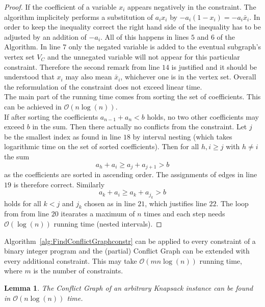 \documentclass[titlepage, a4paper]{amsbook}
\theoremstyle{plain}
\newtheorem{lem}[thm]{Lemma}
\theoremstyle{break}
\theoremstyle{definition}
\theoremstyle{remark}
\numberwithin{equation}{thm}
\begin{document}
\begin{proof}
If the coefficient of a variable $x_i$ appears negatively in the constraint. The algorithm implicitely performs a substitution of $a_i x_i$ by $-a_i(1-x_i) = -a_i \bar{x}_i$. In order to keep the inequality correct the right hand side of the inequality has to be adjusted by an addition of $-a_i$. All of this happens in lines $5$ and $6$ of the Algorithm. In line $7$ only the negated variable is added to the eventual subgraph's vertex set $V_C$ and the unnegated variable will not appear for this particular constraint. Therefore the second remark from line $14$ is justified and it should be understood that $x_i$ may also mean $\bar{x}_i$, whichever one is in the vertex set. Overall the reformulation of the constraint does not exceed linear time.\\
The main part of the running time comes from sorting the set of coefficients. This can be achieved in $\mathcal{O}(n \log(n))$. \\
If after sorting the coefficients $a_{n-1}+ a_n < b$ holds, no two other coefficients may exceed $b$ in the sum. Then there actually no conflicts from the constraint.
Let $j$ be the smallest index as found in line $18$ by interval nesting (which takes logarithmic time on the set of sorted coefficients). Then for all $h,i \geq j$ with $h \neq i$ the sum
\[a_h + a_i \geq a_{j} + a_{j+1} > b\]
as the coefficients are sorted in ascending order. The assignments of edges in line $19$ is therefore correct.
Similarly
\[a_k + a_i \geq a_k + a_{j_k} > b \]
holds for all $k < j$ and $j_k$ chosen as in line $21$, which justifies line $22$. The loop from from line $20$ itearates a maximum of $n$ times and each step needs $\mathcal{O}(\log(n))$ running time (nested intervals).
\end{proof}
Algorithm~\ref{alg:FindConflictGraphconstr} can be applied to every constraint of a binary integer program and the (partial) Conflict Graph can be extended with every additional constraint. This may take $\mathcal{O}(m n \log(n))$ running time, where $m$ is the number of constraints. 
\begin{lem}\label{lem:conflict graph knapsack}
The Conflict Graph of an arbitrary Knapsack instance can be found in $\mathcal{O}(n \log(n))$ time. 
\end{lem}
\end{document}
